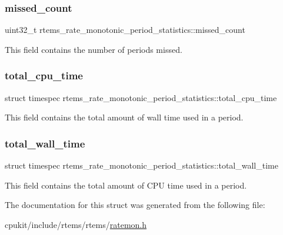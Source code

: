 \subsubsection{\texorpdfstring{missed\_count}{missed\_count}}
{\footnotesize\ttfamily uint32\+\_\+t rtems\+\_\+rate\+\_\+monotonic\+\_\+period\+\_\+statistics\+::missed\+\_\+count}

This field contains the number of periods missed. \mbox{\label{structrtems__rate__monotonic__period__statistics_a209967fe6ee88a6599e0e2d77b827248}} 
\subsubsection{\texorpdfstring{total\_cpu\_time}{total\_cpu\_time}}
{\footnotesize\ttfamily struct timespec rtems\+\_\+rate\+\_\+monotonic\+\_\+period\+\_\+statistics\+::total\+\_\+cpu\+\_\+time}

This field contains the total amount of wall time used in a period. \mbox{\label{structrtems__rate__monotonic__period__statistics_a759772098759efd12022beab812798f5}} 
\subsubsection{\texorpdfstring{total\_wall\_time}{total\_wall\_time}}
{\footnotesize\ttfamily struct timespec rtems\+\_\+rate\+\_\+monotonic\+\_\+period\+\_\+statistics\+::total\+\_\+wall\+\_\+time}

This field contains the total amount of C\+PU time used in a period. 

The documentation for this struct was generated from the following file\+:\begin{DoxyCompactItemize}
\item 
cpukit/include/rtems/rtems/\mbox{\hyperlink{ratemon_8h}{ratemon.\+h}}\end{DoxyCompactItemize}
